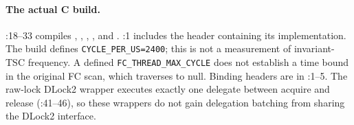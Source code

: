\paragraph{The actual C build.}
:18--33 compiles
,
,
, , and .
:1 includes the header containing its implementation.
The build defines \texttt{CYCLE\_PER\_US=2400}; this is not a measurement of
invariant-TSC frequency. A defined \texttt{FC\_THREAD\_MAX\_CYCLE} does not
establish a time bound in the original FC scan, which traverses to null.
Binding headers are in :1--5.
The raw-lock DLock2 wrapper executes exactly one delegate between acquire and
release (:41--46), so these wrappers do not gain delegation
batching from sharing the DLock2 interface.

